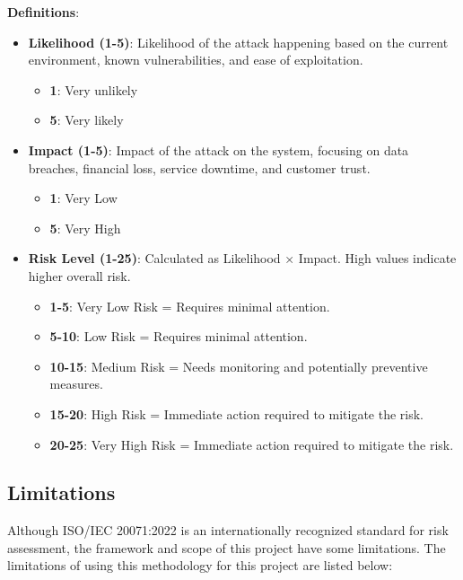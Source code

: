 \newpage
\textbf{Definitions}:
    \begin{itemize}
        \item  \textbf{Likelihood (1-5)}: Likelihood of the attack happening based on the current environment, known vulnerabilities, and ease of exploitation.          \begin{itemize}
            \item \textbf{1}: Very unlikely
            \item \textbf{5}: Very likely
         \end{itemize}
        \item \textbf{Impact (1-5)}: Impact of the attack on the system, focusing on data breaches, financial loss, service downtime, and customer trust.
         \begin{itemize}
            \item \textbf{1}: Very Low
            \item \textbf{5}: Very High
         \end{itemize}
         
       \item  \textbf{Risk Level (1-25)}: Calculated as Likelihood × Impact. High values indicate higher overall risk. 
       \begin{itemize}
           \item \textbf{1-5}: Very Low Risk = Requires minimal attention.
           \item \textbf{5-10}: Low Risk = Requires minimal attention.
           \item \textbf{10-15}: Medium Risk = Needs monitoring and potentially preventive measures.
           \item \textbf{15-20}: High Risk = Immediate action required to mitigate the risk.
           \item \textbf{20-25}: Very High Risk = Immediate action required to mitigate the risk.

       \end{itemize}
    \end{itemize}

    
\subsection{Limitations}  
Although ISO/IEC 20071:2022 is an internationally recognized standard for risk assessment, the framework and scope of this project have some limitations. The limitations of using this methodology for this project are listed below:

